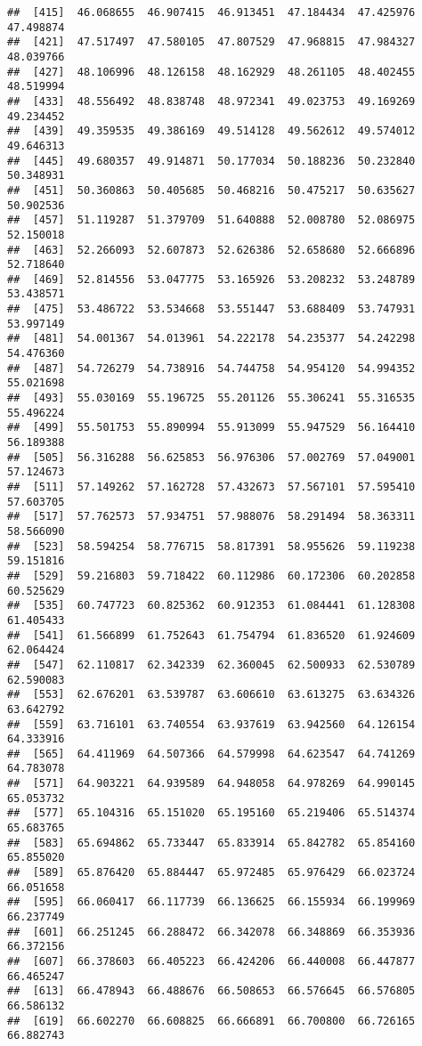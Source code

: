 \documentclass[]{article}
\begin{document}
\begin{verbatim}
##  [415]  46.068655  46.907415  46.913451  47.184434  47.425976  47.498874
##  [421]  47.517497  47.580105  47.807529  47.968815  47.984327  48.039766
##  [427]  48.106996  48.126158  48.162929  48.261105  48.402455  48.519994
##  [433]  48.556492  48.838748  48.972341  49.023753  49.169269  49.234452
##  [439]  49.359535  49.386169  49.514128  49.562612  49.574012  49.646313
##  [445]  49.680357  49.914871  50.177034  50.188236  50.232840  50.348931
##  [451]  50.360863  50.405685  50.468216  50.475217  50.635627  50.902536
##  [457]  51.119287  51.379709  51.640888  52.008780  52.086975  52.150018
##  [463]  52.266093  52.607873  52.626386  52.658680  52.666896  52.718640
##  [469]  52.814556  53.047775  53.165926  53.208232  53.248789  53.438571
##  [475]  53.486722  53.534668  53.551447  53.688409  53.747931  53.997149
##  [481]  54.001367  54.013961  54.222178  54.235377  54.242298  54.476360
##  [487]  54.726279  54.738916  54.744758  54.954120  54.994352  55.021698
##  [493]  55.030169  55.196725  55.201126  55.306241  55.316535  55.496224
##  [499]  55.501753  55.890994  55.913099  55.947529  56.164410  56.189388
##  [505]  56.316288  56.625853  56.976306  57.002769  57.049001  57.124673
##  [511]  57.149262  57.162728  57.432673  57.567101  57.595410  57.603705
##  [517]  57.762573  57.934751  57.988076  58.291494  58.363311  58.566090
##  [523]  58.594254  58.776715  58.817391  58.955626  59.119238  59.151816
##  [529]  59.216803  59.718422  60.112986  60.172306  60.202858  60.525629
##  [535]  60.747723  60.825362  60.912353  61.084441  61.128308  61.405433
##  [541]  61.566899  61.752643  61.754794  61.836520  61.924609  62.064424
##  [547]  62.110817  62.342339  62.360045  62.500933  62.530789  62.590083
##  [553]  62.676201  63.539787  63.606610  63.613275  63.634326  63.642792
##  [559]  63.716101  63.740554  63.937619  63.942560  64.126154  64.333916
##  [565]  64.411969  64.507366  64.579998  64.623547  64.741269  64.783078
##  [571]  64.903221  64.939589  64.948058  64.978269  64.990145  65.053732
##  [577]  65.104316  65.151020  65.195160  65.219406  65.514374  65.683765
##  [583]  65.694862  65.733447  65.833914  65.842782  65.854160  65.855020
##  [589]  65.876420  65.884447  65.972485  65.976429  66.023724  66.051658
##  [595]  66.060417  66.117739  66.136625  66.155934  66.199969  66.237749
##  [601]  66.251245  66.288472  66.342078  66.348869  66.353936  66.372156
##  [607]  66.378603  66.405223  66.424206  66.440008  66.447877  66.465247
##  [613]  66.478943  66.488676  66.508653  66.576645  66.576805  66.586132
##  [619]  66.602270  66.608825  66.666891  66.700800  66.726165  66.882743

\end{verbatim}
\end{document}
